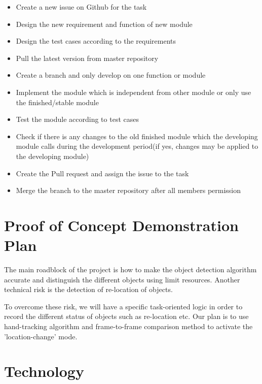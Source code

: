 \documentclass{article}
\begin{document}
\begin{large}
\begin{itemize}
    \item Create a new issue on Github for the task
	\item Design the new requirement and function of new module
	\item Design the test cases according to the requirements
	\item Pull the latest version from master repository
	\item Create a branch and only develop on one function or module
	\item Implement the module which is independent from other module or only use the finished/stable module
	\item Test the module according to test cases
	\item Check if there is any changes to the old finished module which the developing module calls during the development period(if yes, changes may be applied to the developing module)
	\item Create the Pull request and assign the issue to the task 
	\item Merge the branch to the master repository after all members permission

\end{itemize}

\section{Proof of Concept Demonstration Plan}


\hspace{0.5cm}The main roadblock of the project is how to make the object detection algorithm accurate and distinguish the different objects using limit resources. Another technical risk is the detection of re-location of objects.

To overcome these risk, we will have a specific task-oriented logic in order to record the different status of objects such as re-location etc. Our plan is to use hand-tracking algorithm and frame-to-frame comparison method to activate the 'location-change' mode.


\section{Technology}


\end{large}
\end{document}
